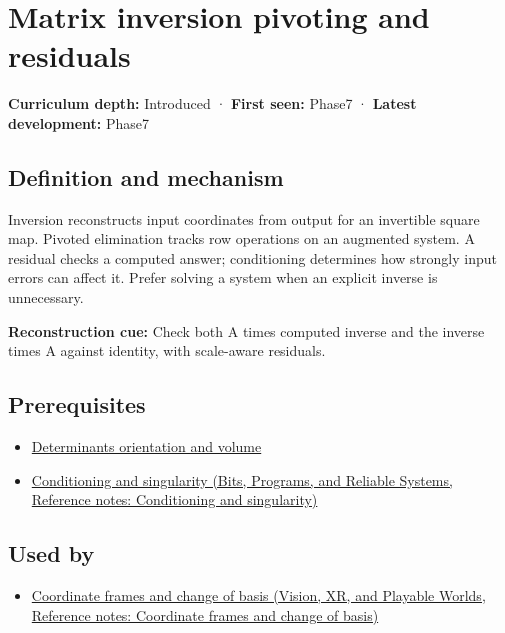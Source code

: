 \hypertarget{appendix-48d2e66378ab}{}\label{referencestart:appendix-48d2e66378ab}
\section{Matrix inversion pivoting and residuals}\label{appendix-48d2e66378ab-matrix-inversion-pivoting-and-residuals}

\textbf{Curriculum depth:} Introduced · \textbf{First seen:} Phase7 · \textbf{Latest development:} Phase7

\subsection{Definition and mechanism}\label{appendix-48d2e66378ab-definition-and-mechanism}

Inversion reconstructs input coordinates from output for an invertible square map. Pivoted elimination tracks row operations on an augmented system. A residual checks a computed answer; conditioning determines how strongly input errors can affect it. Prefer solving a system when an explicit inverse is unnecessary.

\textbf{Reconstruction cue:} Check both A times computed inverse and the inverse times A against identity, with scale-aware residuals.

\subsection{Prerequisites}\label{appendix-48d2e66378ab-prerequisites}

\begin{itemize}
\tightlist
\item
  \hyperref[appendix-da478be01d02]{Determinants orientation and volume}
\item
  \href{../01-Bits-Programs-and-Reliable-Systems/main.pdf\#nameddest=appendix-8f6a01f284a7}{Conditioning and singularity (Bits, Programs, and Reliable Systems, Reference notes: Conditioning and singularity)}
\end{itemize}

\subsection{Used by}\label{appendix-48d2e66378ab-used-by}

\begin{itemize}
\tightlist
\item
  \href{../07-Vision-XR-and-Playable-Worlds/main.pdf\#nameddest=appendix-1bae9457dbc3}{Coordinate frames and change of basis (Vision, XR, and Playable Worlds, Reference notes: Coordinate frames and change of basis)}
\end{itemize}


